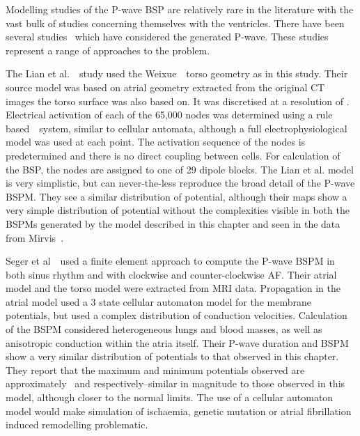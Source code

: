 Modelling studies of the P-wave BSP are relatively rare in the literature with
the vast bulk of studies concerning themselves with the ventricles.
There have been several
studies~\cite{Lian2002,Seger2004,Oosterom2005,vanDam2005} which have considered
the generated P-wave.
These studies represent a range of approaches to the problem.

The Lian et al.~\cite{Lian2002}\ study used the Weixue~\cite{Weixue1993,Weixue1996}\ torso
geometry as in this study.
Their source model was based on atrial geometry extracted from the original CT
images the torso surface was also based on.
It was discretised at a resolution of .
Electrical activation of each of the 65,000 nodes was determined using a rule
based~\cite{Weixue1993}\ system, similar to cellular automata, although a full
electrophysiological model was used at each point.
The activation sequence of the nodes is predetermined and there is no direct
coupling between cells.
For calculation of the BSP, the nodes are assigned to one of 29 dipole blocks.
The Lian et al. model is very simplistic, but can never-the-less reproduce the
broad detail of the P-wave BSPM.
They see a similar distribution of potential, although their maps show a very
simple distribution of potential without the complexities visible in both the
BSPMs generated by the model described in this chapter and seen in the data from
Mirvis~\cite{Mirvis1980}.

Seger et al~\cite{Seger2004}\ used a finite element approach to compute the
P-wave BSPM in both sinus rhythm and with clockwise and counter-clockwise AF.
Their atrial model and the torso model were extracted from MRI data.
Propagation in the atrial model used a 3 state cellular automaton model for the
membrane potentials, but used a complex distribution of conduction velocities.
Calculation of the BSPM considered heterogeneous lungs and blood masses, as well
as anisotropic conduction within the atria itself.
Their P-wave duration and BSPM show a very similar distribution of potentials to
that observed in this chapter.
They report that the maximum and minimum potentials observed are approximately
\ and  respectively--similar in magnitude to those observed
in this model, although closer to the normal limits.
The use of a cellular automaton model would make simulation of ischaemia, genetic
mutation or atrial fibrillation induced remodelling problematic.

